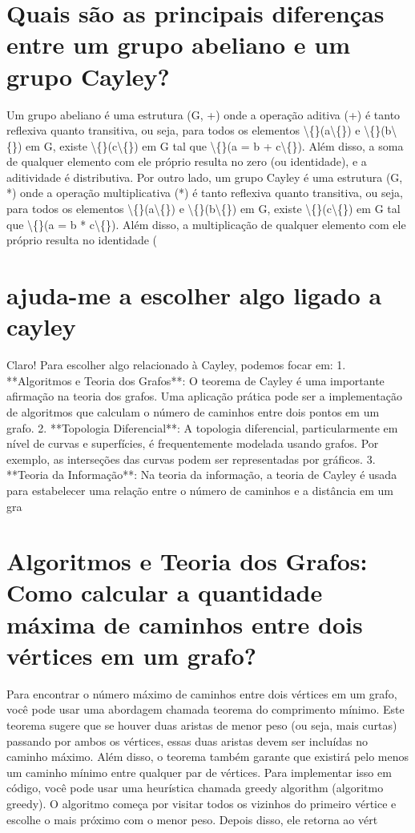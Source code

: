 \documentclass[11pt,a4paper]{article}
\begin{document}
\section{Quais são as principais diferenças entre um grupo abeliano e um grupo Cayley?}
Um grupo abeliano é uma estrutura (G, +) onde a operação aditiva (+) é tanto reflexiva quanto transitiva, ou seja, para todos os elementos \textbackslash\{\}(a\textbackslash\{\}) e \textbackslash\{\}(b\textbackslash\{\}) em G, existe \textbackslash\{\}(c\textbackslash\{\}) em G tal que \textbackslash\{\}(a = b + c\textbackslash\{\}). Além disso, a soma de qualquer elemento com ele próprio resulta no zero (ou identidade), e a aditividade é distributiva. Por outro lado, um grupo Cayley é uma estrutura (G, *) onde a operação multiplicativa (*) é tanto reflexiva quanto transitiva, ou seja, para todos os elementos \textbackslash\{\}(a\textbackslash\{\}) e \textbackslash\{\}(b\textbackslash\{\}) em G, existe \textbackslash\{\}(c\textbackslash\{\}) em G tal que \textbackslash\{\}(a = b * c\textbackslash\{\}). Além disso, a multiplicação de qualquer elemento com ele próprio resulta no identidade (

\section{ajuda-me a escolher algo ligado a cayley}
Claro! Para escolher algo relacionado à Cayley, podemos focar em: 1. **Algoritmos e Teoria dos Grafos**: O teorema de Cayley é uma importante afirmação na teoria dos grafos. Uma aplicação prática pode ser a implementação de algoritmos que calculam o número de caminhos entre dois pontos em um grafo. 2. **Topologia Diferencial**: A topologia diferencial, particularmente em nível de curvas e superfícies, é frequentemente modelada usando grafos. Por exemplo, as interseções das curvas podem ser representadas por gráficos. 3. **Teoria da Informação**: Na teoria da informação, a teoria de Cayley é usada para estabelecer uma relação entre o número de caminhos e a distância em um gra

\section{Algoritmos e Teoria dos Grafos: Como calcular a quantidade máxima de caminhos entre dois vértices em um grafo?}
Para encontrar o número máximo de caminhos entre dois vértices em um grafo, você pode usar uma abordagem chamada teorema do comprimento mínimo. Este teorema sugere que se houver duas aristas de menor peso (ou seja, mais curtas) passando por ambos os vértices, essas duas aristas devem ser incluídas no caminho máximo. Além disso, o teorema também garante que existirá pelo menos um caminho mínimo entre qualquer par de vértices. Para implementar isso em código, você pode usar uma heurística chamada greedy algorithm (algoritmo greedy). O algoritmo começa por visitar todos os vizinhos do primeiro vértice e escolhe o mais próximo com o menor peso. Depois disso, ele retorna ao vért
\end{document}
